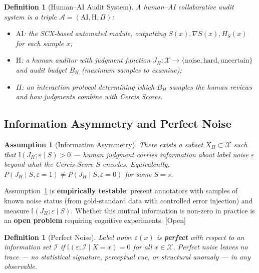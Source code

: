 \documentclass[12pt,a4paper]{article}
\newtheorem{definition}[theorem]{Definition}
\newtheorem{assumption}[theorem]{Assumption}
\newcommand{\openquest}{\textcolor{red!70!black}{\small\textsf{[Open]}}}
\newcommand{\I}{\mathbb{I}}
\newcommand{\cX}{\mathcal{X}}
\newcommand{\cA}{\mathcal{A}}
\newcommand{\cI}{\mathcal{I}}
\begin{document}
\begin{definition}[Human--AI Audit System]
\label{def:collab-system}
A human--AI collaborative audit system is a triple
$\cA = (\mathrm{AI}, \mathrm{H}, \Pi)$:
\begin{itemize}
    \item $\mathrm{AI}$: the SCX-based automated module, outputting
          $S(x), \nabla S(x), H_S(x)$ for each sample $x$;
    \item $\mathrm{H}$: a human auditor with judgment function
          $J_H: \cX \to \{\text{noise}, \text{hard}, \text{uncertain}\}$
          and audit budget $B_H$ (maximum samples to examine);
    \item $\Pi$: an interaction protocol determining which $B_H$ samples the
          human reviews and how judgments combine with Cercis Scores.
\end{itemize}
\end{definition}

\subsection{Information Asymmetry and Perfect Noise}

\begin{assumption}[Information Asymmetry]
\label{ass:asymmetry}
There exists a subset $X_H \subset \cX$ such that
$\I(J_H; \varepsilon \mid S) > 0$ — human judgment carries information
about label noise $\varepsilon$ beyond what the Cercis Score $S$ encodes.
Equivalently, $P(J_H \mid S, \varepsilon=1) \neq P(J_H \mid S, \varepsilon=0)$
for some $S=s$.
\end{assumption}

Assumption~\ref{ass:asymmetry} is \textbf{empirically testable}: present
annotators with samples of known noise status (from gold-standard data with
controlled error injection) and measure $\I(J_H; \varepsilon \mid S)$.
Whether this mutual information is non-zero in practice is an \textbf{open
problem} requiring cognitive experiments.  \openquest

\begin{definition}[Perfect Noise]
\label{def:perfect-noise}
Label noise $\varepsilon(x)$ is \textbf{perfect} with respect to an
information set $\cI$ if $\I(\varepsilon; \cI \mid X=x) = 0$ for all
$x \in \cX$.  Perfect noise leaves \emph{no trace} — no statistical
signature, perceptual cue, or structural anomaly — in any observable.
\end{definition}
\end{document}
